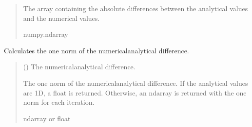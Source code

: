 \documentclass[a4paper,11pt,english,openany]{sphinxmanual}
\begin{document}
\begin{fulllineitems}
\begin{fulllineitems}
\begin{quote}
\begin{description}
\sphinxAtStartPar
The array containing the absolute differences between the analytical values and the numerical values.

\sphinxAtStartPar
numpy.ndarray

\end{description}\end{quote}

\end{fulllineitems}


\begin{fulllineitems}
\label{\detokenize{api/spyice.utils.error_norms:spyice.utils.error_norms.ErrorNorms.one_norm}}
\pysigstartsignatures
{}
\pysigstopsignatures
\sphinxAtStartPar
Calculates the one norm of the numerical\sphinxhyphen{}analytical difference.
\begin{quote}\begin{description}
\sphinxAtStartPar
{} () \textendash{} The numerical\sphinxhyphen{}analytical difference.

\sphinxAtStartPar
The one norm of the numerical\sphinxhyphen{}analytical difference. If the analytical values are 1D, a float is returned. Otherwise, an ndarray is returned with the one norm for each iteration.

\sphinxAtStartPar
ndarray or float

\sphinxAtStartPar
{} \textendash{} 

\end{description}\end{quote}

\end{fulllineitems}



\end{fulllineitems}
\end{document}
